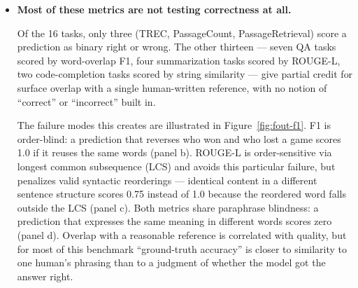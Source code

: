 \documentclass[10pt,letterpaper]{article}
\begin{document}
\begin{itemize}
  On six of our 16 tasks the full model's ground-truth accuracy is below
  15 (NarrativeQA: 5.5, MuSiQue: 6.9, PassageCount: 3.0, HotpotQA: 9.9,
  Qasper: 11.1, QMSum: 10.3). On NarrativeQA, for example, the full
  model gets 94.5\% of examples wrong. Moreover, even the 5.5\% that the
  full model answers correctly need not be the same 5.5\% a compressed
  method gets right --- two methods with identical aggregate scores may
  agree on no individual examples. The score carries no information
  about which questions were answered correctly, only that the same
  number were.

  A perfectly faithful compressed method should get 94.5\% wrong; ground
  truth scores all of those as 0, leaving only noise: how closely each
  method's wrong answers happen to overlap with the gold string. The
  signal about compression quality is smallest precisely on the tasks
  where the method has the most work to do. The failure is symmetric: a
  compressed method that outscores the full model is a faithfulness
  failure --- ground truth rewards accidental divergence from the full
  model.

\item
  \textbf{Most of these metrics are not testing correctness at all.}

\nopagebreak
  Of the 16 tasks, only three (TREC, PassageCount, PassageRetrieval) score
  a prediction as binary right or wrong. The other thirteen --- seven QA
  tasks scored by word-overlap F1, four summarization tasks scored by
  ROUGE-L, two code-completion tasks scored by string similarity ---
  give partial credit for surface overlap with a single human-written
  reference, with no notion of ``correct'' or ``incorrect'' built in.

  The failure modes this creates are illustrated in
  Figure~\ref{fig:fout-f1}. F1 is order-blind: a prediction that
  reverses who won and who lost a game scores 1.0 if it reuses the same
  words (panel b). ROUGE-L is order-sensitive via longest common
  subsequence (LCS) and avoids this particular failure, but penalizes valid
  syntactic reorderings --- identical content in a different sentence
  structure scores 0.75 instead of 1.0 because the reordered word falls
  outside the LCS (panel c). Both metrics share paraphrase blindness: a
  prediction that expresses the same meaning in different words scores
  zero (panel d). Overlap with a reasonable reference is correlated with
  quality, but for most of this benchmark ``ground-truth accuracy'' is
  closer to similarity to one human's phrasing than to a judgment of
  whether the model got the answer right.


\end{itemize}
\end{document}
